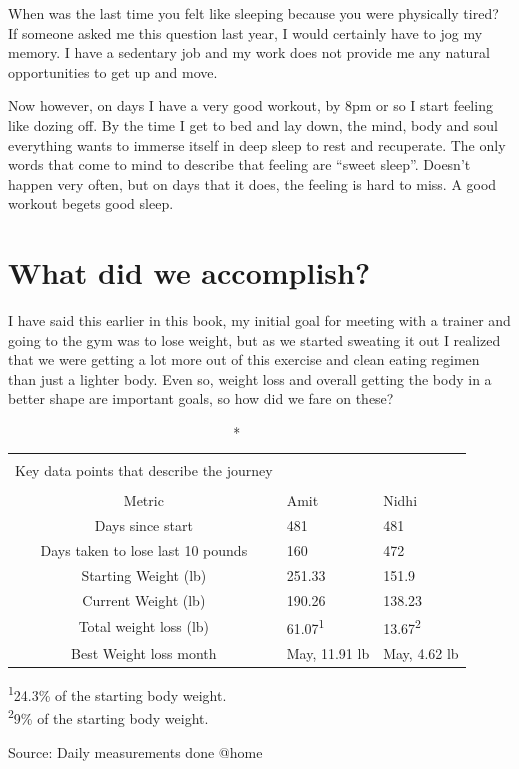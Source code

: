 \documentclass[
  oneside]{book}
\begin{document}
When was the last time you felt like sleeping because you were physically tired? If someone asked me this question last year, I would certainly have to jog my memory. I have a sedentary job and my work does not provide me any natural opportunities to get up and move.

Now however, on days I have a very good workout, by 8pm or so I start feeling like dozing off. By the time I get to bed and lay down, the mind, body and soul everything wants to immerse itself in deep sleep to rest and recuperate. The only words that come to mind to describe that feeling are ``sweet sleep''. Doesn't happen very often, but on days that it does, the feeling is hard to miss. A good workout begets good sleep.

\hypertarget{what-did-we-accomplish}{%
\chapter{What did we accomplish?}\label{what-did-we-accomplish}}

I have said this earlier in this book, my initial goal for meeting with a trainer and going to the gym was to lose weight, but as we started sweating it out I realized that we were getting a lot more out of this exercise and clean eating regimen than just a lighter body. Even so, weight loss and overall getting the body in a better shape are important goals, so how did we fare on these?

\captionsetup[table]{labelformat=empty,skip=1pt}
\begin{longtable}{cll}
\caption*{
\large \textbf{Important Metrics}\\ 
\small Key data points that describe the journey\\ 
} \\ 
\toprule
Metric & Amit & Nidhi \\ 
\midrule
Days since start & 481 & 481 \\ 
Days taken to lose last 10 pounds & 160 & 472 \\ 
Starting Weight (lb) & 251.33 & 151.9 \\ 
Current Weight (lb) & 190.26 & 138.23 \\ 
Total weight loss (lb) & 61.07\textsuperscript{1} & 13.67\textsuperscript{2} \\ 
Best Weight loss month & May, 11.91 lb & May, 4.62 lb \\ 
\bottomrule
\end{longtable}
\vspace{-5mm}
\begin{minipage}{\linewidth}
\textsuperscript{1}24.3\% of the starting body weight. \\ 
\textsuperscript{2}9\% of the starting body weight. \\ 
\end{minipage}
\begin{minipage}{\linewidth}
Source: Daily measurements done @home\\ 
\end{minipage}
\end{document}
